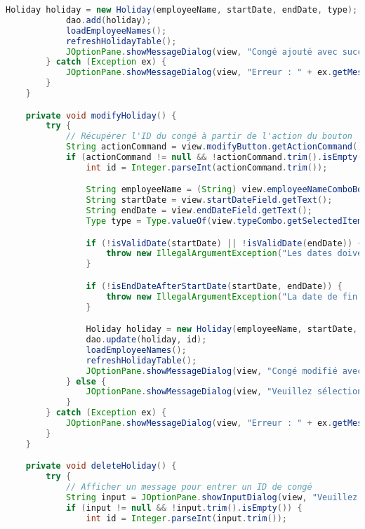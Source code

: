 \documentclass[a4paper,12pt]{article}
\begin{document}
\begin{lstlisting}[language=Java]
            Holiday holiday = new Holiday(employeeName, startDate, endDate, type);
            dao.add(holiday);
            loadEmployeeNames(); 
            refreshHolidayTable();
            JOptionPane.showMessageDialog(view, "Congé ajouté avec succès.");
        } catch (Exception ex) {
            JOptionPane.showMessageDialog(view, "Erreur : " + ex.getMessage());
        }
    }

    private void modifyHoliday() {
        try {
            // Récupérer l'ID du congé à partir de l'action du bouton
            String actionCommand = view.modifyButton.getActionCommand();
            if (actionCommand != null && !actionCommand.trim().isEmpty()) {
                int id = Integer.parseInt(actionCommand.trim());

                String employeeName = (String) view.employeeNameComboBox.getSelectedItem();
                String startDate = view.startDateField.getText();
                String endDate = view.endDateField.getText();
                Type type = Type.valueOf(view.typeCombo.getSelectedItem().toString().toUpperCase());

                if (!isValidDate(startDate) || !isValidDate(endDate)) {
                    throw new IllegalArgumentException("Les dates doivent être au format YYYY-MM-DD.");
                }

                if (!isEndDateAfterStartDate(startDate, endDate)) {
                    throw new IllegalArgumentException("La date de fin doit être supérieure à la date de début.");
                }

                Holiday holiday = new Holiday(employeeName, startDate, endDate, type);
                dao.update(holiday, id);
                loadEmployeeNames(); 
                refreshHolidayTable();
                JOptionPane.showMessageDialog(view, "Congé modifié avec succès.");
            } else {
                JOptionPane.showMessageDialog(view, "Veuillez sélectionner un congé à modifier.");
            }
        } catch (Exception ex) {
            JOptionPane.showMessageDialog(view, "Erreur : " + ex.getMessage());
        }
    }

    private void deleteHoliday() {
        try {
            // Afficher un message pour entrer un ID de congé
            String input = JOptionPane.showInputDialog(view, "Veuillez entrer l'ID du congé à supprimer:");
            if (input != null && !input.trim().isEmpty()) {
                int id = Integer.parseInt(input.trim());
    

\end{lstlisting}
\end{document}
